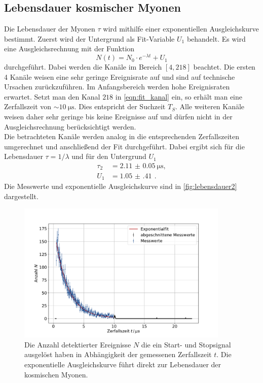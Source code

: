 \subsection{Lebensdauer kosmischer Myonen}
Die Lebensdauer der Myonen $\tau$ wird mithilfe einer exponentiellen Ausgleichskurve bestimmt.
Zuerst wird der Untergrund als Fit-Variable $U_1$ behandelt.
Es wird eine Ausgleichsrechnung mit der Funktion
\begin{equation}
    N(t) = N_0 \cdot e^{- \lambda t} + U_1
\end{equation}
durchgeführt.
Dabei werden die Kanäle im Bereich $[4, 218]$ beachtet.
Die ersten 4 Kanäle weisen eine sehr geringe Ereignisrate auf und sind auf technische Ursachen zurückzuführen.
Im Anfangsbereich werden hohe Ereignisraten erwartet.
Setzt man den Kanal $218$ in \autoref{eqn:fit_kanal} ein, so erhält man eine Zerfallszeit von $\sim \qty{10}{\micro\second}$.
Dies entspricht der Suchzeit $T_S$.
Alle weiteren Kanäle weisen daher sehr geringe bis keine Ereignisse auf und dürfen nicht in der Ausgleichsrechnung berücksichtigt werden.
\\
Die betrachteten Kanäle werden analog in die entsprechenden Zerfallszeiten umgerechnet und anschließend der Fit durchgeführt.
Dabei ergibt sich für die Lebensdauer $\tau = 1/\lambda$ und für den Untergrund $U_1$
\begin{align}
    \tau_2 &= \qty{2.11(5)}{\micro\second},\\
    U_1 &= \qty{1.05(41)}{} \,.
\end{align}
Die Messwerte und exponentielle Ausgleichskurve sind in \autoref{fig:lebensdauer2} dargestellt.
\begin{figure}
    \centering
    \includegraphics[width=0.9\textwidth]{content/plots/lifetime.pdf}
    \caption{Die Anzahl detektierter Ereignisse $N$ die ein Start- und Stopsignal ausgelöst haben in Abhängigkeit der gemessenen Zerfallszeit $t$.
    Die exponentielle Ausgleichskurve führt direkt zur Lebensdauer der kosmischen Myonen.
    }
    \label{fig:lebensdauer2}
\end{figure}

